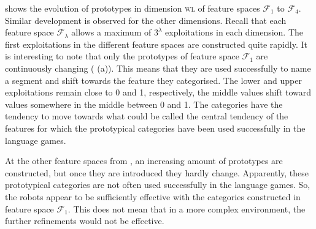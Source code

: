  shows the evolution of prototypes in dimension {\scshape wl} of feature spaces ${\mathcal F}_1$ to ${\mathcal F}_4$. Similar development is observed for the other dimensions. Recall that each feature space ${\mathcal F}_\lambda$ allows a maximum of $3^\lambda$ exploitations in each dimension. The first exploitations in the different feature spaces are constructed quite rapidly. It is interesting to note that only the prototypes of feature space ${\mathcal F}_1$  are continuously changing ( (a)). This means that they are used successfully to name a segment and shift towards the feature they categorised. The lower and upper exploitations remain close to 0 and 1, respectively, the middle values shift toward values somewhere in the middle between 0 and 1. The categories have the tendency to move towards what could be called the central tendency of the features for which the prototypical categories have been used successfully in the language games. 

At the other feature spaces from , an increasing amount of prototypes are constructed, but once they are introduced they hardly change. Apparently, these prototypical categories are not often used successfully in the language games. So, the robots appear to be sufficiently effective with the categories constructed in feature space ${\mathcal F}_1$. This does not mean that in a more complex environment, the further refinements would not be effective.

